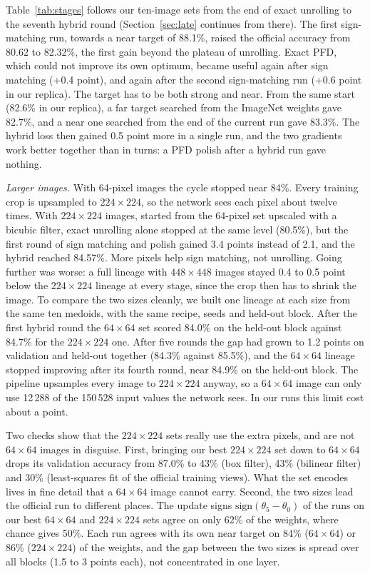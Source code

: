 \documentclass[journal]{IEEEtran}
\begin{document}
Table~\ref{tab:stages} follows our ten-image sets from the end of exact unrolling to the seventh hybrid round
(Section~\ref{sec:late} continues from there). The first
sign-matching run, towards a near target of 88.1\%, raised the official accuracy from 80.62 to 82.32\%, the first gain
beyond the plateau of unrolling. Exact PFD, which could not improve its own optimum, became useful again after sign
matching (+0.4 point), and again after the second sign-matching run (+0.6 point in our replica). The target has to be both strong and near. From
the same start (82.6\% in our replica), a far target searched from the ImageNet weights gave 82.7\%, and a near one
searched from the end of the current run gave 83.3\%. The hybrid loss then gained 0.5 point more in a single run, and
the two gradients work better together than in turns: a PFD polish after a hybrid run gave nothing.

\emph{Larger images.} With 64-pixel images the cycle stopped near 84\%. Every training crop is upsampled to
$224\times224$, so the network sees each pixel about twelve times. With $224\times224$ images, started from the
64-pixel set upscaled with a bicubic filter, exact unrolling alone stopped at the same level (80.5\%), but the first
round of sign matching and polish gained 3.4 points instead of 2.1, and the hybrid reached 84.57\%. More pixels help
sign matching, not unrolling. Going further was worse: a full lineage with $448\times448$ images stayed 0.4 to 0.5
point below the $224\times224$ lineage at every stage, since the crop then has to shrink the image. To compare
the two sizes cleanly, we built one lineage at each size from the same ten medoids, with the same recipe, seeds and
held-out block. After the first hybrid round the $64\times64$ set scored 84.0\% on the held-out block against
84.7\% for the $224\times224$ one. After five rounds the gap had grown to 1.2 points on validation and held-out
together (84.3\% against 85.5\%), and the $64\times64$ lineage stopped improving after its fourth round, near 84.9\%
on the held-out block. The pipeline upsamples every image to $224\times224$ anyway, so a $64\times64$ image can only
use 12\,288 of the 150\,528 input values the network sees. In our runs this limit cost about a point.

Two checks show that the $224\times224$ sets really use the extra pixels, and are not $64\times64$ images in disguise.
First, bringing our best $224\times224$ set down to $64\times64$ drops its validation accuracy from 87.0\% to 43\% (box
filter), 43\% (bilinear filter) and 30\% (least-squares fit of the official training views). What the set encodes
lives in fine detail that a $64\times64$ image cannot carry. Second, the two sizes lead the official run to different
places. The update signs $\mathrm{sign}(\theta_5-\theta_0)$ of the runs on our best $64\times64$ and $224\times224$
sets agree on only 62\% of the weights, where chance gives 50\%. Each run agrees with its own near target on 84\%
($64\times64$) or 86\% ($224\times224$) of the weights, and the gap between the two sizes is spread over all blocks
(1.5 to 3 points each), not concentrated in one layer.
\end{document}
